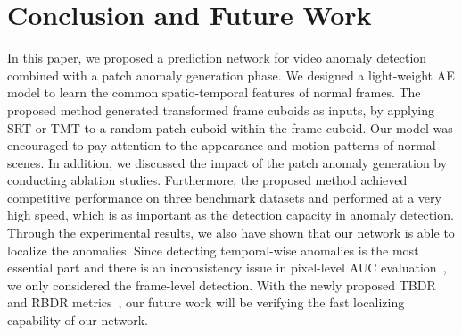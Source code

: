 \documentclass[10pt,twocolumn,letterpaper]{article}
\begin{document}
\section{Conclusion and Future Work}
\vspace{-0.2cm}
In this paper, we proposed a prediction network for video anomaly detection combined with a patch anomaly generation phase. We designed a light-weight AE model to learn the common spatio-temporal features of normal frames. The proposed method generated transformed frame cuboids as inputs, by applying SRT or TMT to a random patch cuboid within the frame cuboid. Our model was encouraged to pay attention to the appearance and motion patterns of normal scenes. In addition, we discussed the impact of the patch anomaly generation by conducting ablation studies. Furthermore, the proposed method achieved competitive performance on three benchmark datasets and performed at a very high speed, which is as important as the detection capacity in anomaly detection.\\
\indent Through the experimental results, we also have shown that our network is able to localize the anomalies. Since detecting temporal-wise anomalies is the most essential part and there is an inconsistency issue in pixel-level AUC evaluation~\cite{9271895}, we only considered the frame-level detection. With the newly proposed TBDR and RBDR metrics~\cite{Ramachandra_2020_WACV}, our future work will be verifying the fast localizing capability of our network.\\




\newpage

{\small
	
	
}
\end{document}
